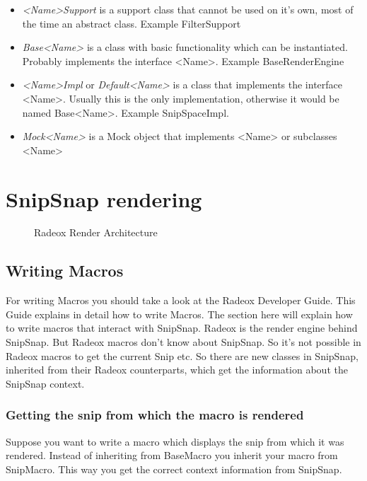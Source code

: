 \documentclass[a4paper,pdftex]{article}
\begin{document}
\begin{itemize}
\item \textit{<Name>Support} is a support class that cannot be used on it's own, most of the time an abstract class. Example FilterSupport
\item \textit{Base<Name>} is a class with basic functionality which can be instantiated. Probably implements the interface <Name>. Example BaseRenderEngine
\item \textit{<Name>Impl} or \textit{Default<Name>} is a class that implements the interface <Name>. Usually this is the only implementation, otherwise it would be named Base<Name>. Example SnipSpaceImpl.
\item \textit{Mock<Name>} is a Mock object that implements <Name> or subclasses <Name>
\end{itemize}

\section{SnipSnap rendering}

\begin{figure}[ht]
  \centering
     \caption{\small\textsf Radeox Render Architecture}
\end{figure}

\subsection{Writing Macros}

For writing  Macros you should take a look at the Radeox Developer Guide. This Guide explains in 
detail how to write Macros. The section here will explain how to write macros that interact with
SnipSnap. Radeox is the render engine behind SnipSnap. But Radeox macros don't know about SnipSnap. 
So it's not possible in Radeox macros to get the current Snip etc. So there are new classes in SnipSnap,
inherited from their Radeox counterparts, which get the information about the SnipSnap context.

\subsubsection{Getting the snip from which the macro is rendered}

Suppose you want to write a macro which displays the snip from which it was rendered.
Instead of inheriting from BaseMacro you inherit your macro from SnipMacro. This
way you get the correct context information from SnipSnap.
\end{document}
